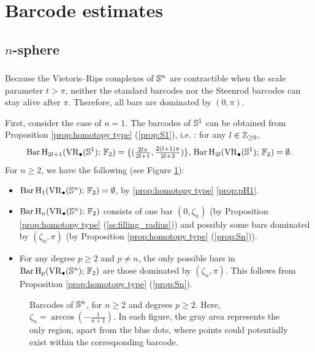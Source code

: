 
\section{Barcode estimates}\label{s:computations}

\subsection{$n$-sphere}\label{ss:Sn}

\subsubsection{}

Because the Vietoris--Rips complexes of $\mathbb{S}^n$ are contractible when the scale parameter $t>\pi$, neither the standard barcodes nor the Steenrod barcodes can stay alive after $\pi$.
Therefore, all bars are dominated by $(0,\pi)$.

First, consider the case of $n=1$.
The barcodes of $\mathbb{S}^1$ can be obtained from Proposition \ref{prop:homotopy type} (\ref{prop:S1}), i.e. \cite[Theorem~7.4]{adamaszek2017vietoris}: for any $l \in \mathbb{Z}_{\geq 0}$,
\begin{equation}\label{eq:barc of S1}
	\operatorname{Bar} \operatorname{H}_{2l+1}(\operatorname{VR}_\bullet(\mathbb{S}^1);\,{\mathbb{F}_2})=\{(\tfrac{2l\pi}{2l+1},\tfrac{2(l+1)\pi}{2l+3})\},\, \operatorname{Bar} \operatorname{H}_{2l}(\operatorname{VR}_\bullet(\mathbb{S}^1);\,{\mathbb{F}_2})=\emptyset.
\end{equation}
For $n\geq 2$, we have the following (see Figure \ref{fig:Sk}):
\begin{itemize}
	\item $\operatorname{Bar} \operatorname{H}_{1}(\operatorname{VR}_\bullet(\mathbb{S}^n);\,{\mathbb{F}_2}) = \emptyset$, by \cref{prop:homotopy type} \cref{prop:pH1}.
	\item $\operatorname{Bar} \operatorname{H}_{n}(\operatorname{VR}_\bullet(\mathbb{S}^n);\,{\mathbb{F}_2})$ consists of one bar $(0,\zeta_n)$ (by Proposition \ref{prop:homotopy type} (\ref{ss:filling_radius})) and possibly some bars dominated by $(\zeta_n,\pi)$ (by Proposition \ref{prop:homotopy type} (\ref{prop:Sn})).
	\item For any degree $p\geq 2$ and $p\neq n$, the only possible bars in $\operatorname{Bar} \operatorname{H}_{p}(\operatorname{VR}_\bullet(\mathbb{S}^n);\,{\mathbb{F}_2})$ are those dominated by $(\zeta_n,\pi)$.
	This follows from Proposition \ref{prop:homotopy type} (\ref{prop:Sn}).
\end{itemize}

\begin{figure}[ht]
	\centering
	
	\caption{Barcodes of $\mathbb{S}^n$, for $n\geq 2$ and degrees $p\geq 2$.
		Here, $\zeta_n=\arccos(-\frac{1}{n+1})$.
		In each figure, the gray area represents the only region, apart from the blue dots, where points could potentially exist within the corresponding barcode.}
	\label{fig:Sk}
\end{figure}

